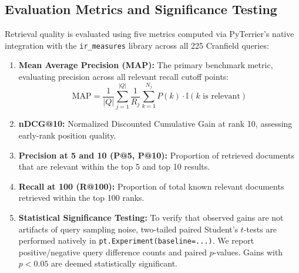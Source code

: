 \documentclass[10pt, a4paper]{article}
\begin{document}
\subsection{Evaluation Metrics and Significance Testing}
Retrieval quality is evaluated using five metrics computed via PyTerrier's native integration with the \texttt{ir\_measures} library across all 225 Cranfield queries:
\begin{enumerate}[noitemsep,topsep=2pt]
    \item \textbf{Mean Average Precision (MAP):} The primary benchmark metric, evaluating precision across all relevant recall cutoff points:
    \begin{equation}
    \text{MAP} = \frac{1}{|Q|} \sum_{j=1}^{|Q|} \frac{1}{R_j} \sum_{k=1}^{N_j} P(k) \cdot \mathbb{I}(k \text{ is relevant})
    \end{equation}
    \item \textbf{nDCG@10:} Normalized Discounted Cumulative Gain at rank 10, assessing early-rank position quality.
    \item \textbf{Precision at 5 and 10 (P@5, P@10):} Proportion of retrieved documents that are relevant within the top 5 and top 10 results.
    \item \textbf{Recall at 100 (R@100):} Proportion of total known relevant documents retrieved within the top 100 ranks.
    \item \textbf{Statistical Significance Testing:} To verify that observed gains are not artifacts of query sampling noise, two-tailed paired Student's $t$-tests are performed natively in \texttt{pt.Experiment(baseline=...)}. We report positive/negative query difference counts and paired $p$-values. Gains with $p < 0.05$ are deemed statistically significant.
\end{enumerate}
\end{document}
